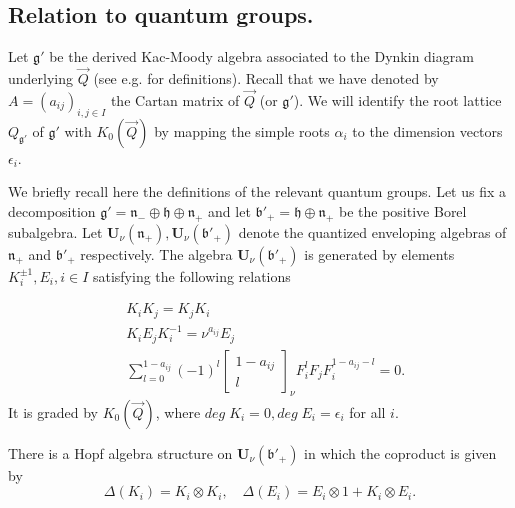 \documentclass[a4paper,10pt]{amsart}
\def\U{\mathbf{U}}
\def\a{\alpha}
\def\g{\mathfrak{g}}
\def\bo{\mathfrak{b}}
\def\h{\mathfrak{h}}
\def\n{\mathfrak{n}}
\def\v{\nu}
\numberwithin{equation}{section}
\begin{document}
\vspace{.3in}

\subsection{Relation to quantum groups.}

\vspace{.15in}

Let $\g'$ be the derived Kac-Moody algebra associated to the Dynkin diagram underlying $\vec{Q}$ (see e.g. \cite[App. A]{Trieste}  for definitions). Recall that we have denoted by $A=(a_{ij})_{i,j \in I}$ the Cartan matrix of $\vec{Q}$ (or $\g'$). We will identify the root lattice $Q_{\g'}$ of $\g'$ with $K_0(\vec{Q})$ by mapping the simple roots $\a_i$ to the dimension vectors $\epsilon_i$.


We briefly recall here the definitions of the relevant quantum groups. Let us fix a decomposition $\g'=\n_- \oplus \h \oplus \n_+$ and let $\bo'_+=\h \oplus \n_+$ be the positive Borel subalgebra. Let $\U_{\v}(\n_+), \U_{\v}(\bo'_+)$ denote the quantized enveloping algebras of $\n_+$ and $\bo'_+$ respectively. The algebra $\U_{\v}(\bo'_+)$ is generated by elements $K_i^{\pm 1}, E_i, i \in I$ satisfying the following relations

\begin{equation}\label{E:defquantumgroups}
\begin{split}
&K_i K_j=K_j K_i  \\
&K_iE_j K_i^{-1}=\v^{a_{ij}} E_j \\
&\sum_{l=0}^{1-a_{ij}} (-1)^l \begin{bmatrix} 1-a_{ij} \\ l \end{bmatrix}_{\nu} F_i^l F_j F_i^{1-a_{ij}-l}=0.
\end{split}
\end{equation}
It is graded by $K_0(\vec{Q})$, where $deg\;K_i=0, deg\;E_i=\epsilon_i$ for all $i$. 

\vspace{.1in}

There is a Hopf algebra structure on $\U_{\v}(\bo'_+)$ in which the coproduct is given by
\begin{equation}\label{E:coprquantum}
\Delta(K_i)=K_i \otimes K_i, \quad \Delta(E_i)=E_i \otimes 1 + K_i \otimes E_i.
\end{equation}
\end{document}
